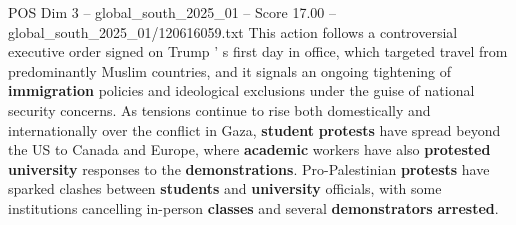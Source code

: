 \begin{textsample}{POS Dim 3 – global\_south\_2025\_01 – Score 17.00 – global\_south\_2025\_01/120616059.txt}
This action follows a controversial executive order signed on Trump ' s first day in office, which targeted travel from predominantly Muslim countries, and it signals an ongoing tightening of \textbf{immigration} policies and ideological exclusions under the guise of national security concerns.
As tensions continue to rise both domestically and internationally over the conflict in Gaza, \textbf{student} \textbf{protests} have spread beyond the US to Canada and Europe, where \textbf{academic} workers have also \textbf{protested} \textbf{university} responses to the \textbf{demonstrations}.
Pro-Palestinian \textbf{protests} have sparked clashes between \textbf{students} and \textbf{university} officials, with some institutions cancelling in-person \textbf{classes} and several \textbf{demonstrators} \textbf{arrested}.

\end{textsample}
